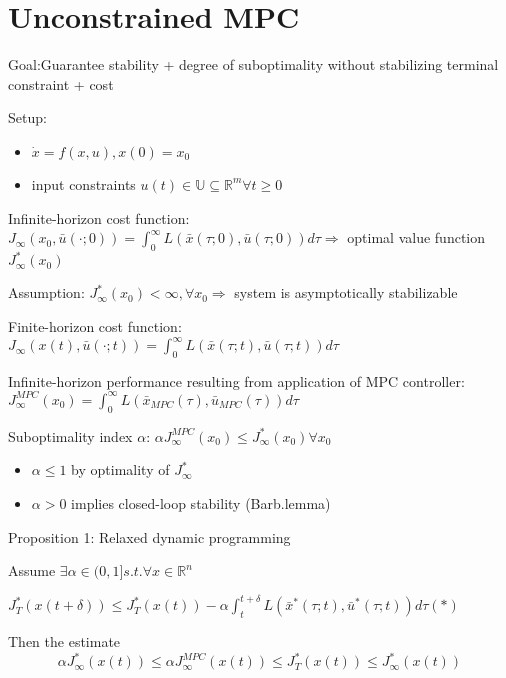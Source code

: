 \section{Unconstrained MPC}\label{chap3}

Goal:Guarantee stability + degree of suboptimality
without stabilizing terminal constraint + cost

Setup: 
\begin{itemize}
\item $\dot x = f(x,u), x(0)=x_0$
\item input constraints $u(t) \in \mathbb{U} \subseteq \mathbb{R}^m \forall t \geq 0$
\end{itemize}

Infinite-horizon cost function:
$J_{\infty}(x_0, \bar{u}(\cdot; 0)) = \int_{0}^{\infty}L(\bar x(\tau;0), \bar u(\tau;0))d\tau  \Rightarrow$ optimal value function $J_{\infty}^*(x_0)$

Assumption: $J^{*}_{\infty}(x_0) < \infty, \forall x_0 \Rightarrow$ system is asymptotically stabilizable

Finite-horizon cost function:
$J_{\infty}(x(t), \bar{u}(\cdot; t)) = \int_{0}^{\infty}L(\bar x(\tau;t), \bar u(\tau;t))d\tau$

Infinite-horizon performance resulting from application of MPC controller:
$J_{\infty}^{MPC}(x_0) = \int_{0}^{\infty}L(\bar x_{MPC}(\tau), \bar u_{MPC}(\tau))d\tau$

\begin{Definition}
Suboptimality index $\alpha$:
$\alpha J_{\infty}^{MPC}(x_0) \leq J_{\infty}^{*}(x_0) \forall x_0$

\begin{itemize}
\item $\alpha \leq 1$ by optimality of $J^{*}_{\infty}$
\item $\alpha > 0$ implies closed-loop stability (Barb.lemma)
\end{itemize}
\end{Definition}

Proposition 1: Relaxed dynamic programming
 
Assume $\exists \alpha \in (0,1] s.t. \forall x \in \mathbb{R}^n$

$J_{T}^{*}(x(t+\delta)) \leq J_T^*(x(t)) - \alpha\int_{t}^{t+\delta}L(\bar x^*(\tau;t),\bar u^*(\tau;t))d\tau (*)$

Then the estimate 
\begin{equation}
\alpha J_{\infty}^*(x(t)) \leq \alpha J_{\infty}^{MPC}(x(t)) \leq J_T^*(x(t)) \leq J_{\infty}^*(x(t))
\end{equation}

